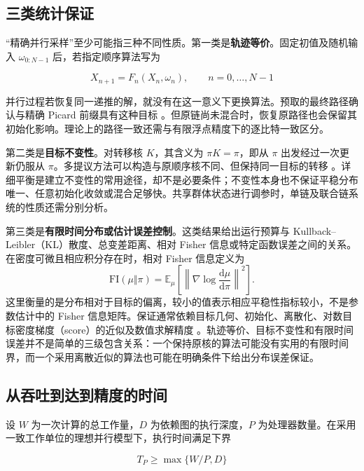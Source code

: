 \documentclass[UTF8,a4paper,zihao=-4,fontset=fandol]{ctexart}
\begin{document}
\subsection{三类统计保证}

“精确并行采样”至少可能指三种不同性质。第一类是\textbf{轨迹等价}。固定初值及随机输入 $\omega_{0:N-1}$ 后，若指定顺序算法写为

\begin{equation}
X_{n+1}=F_n(X_n,\omega_n),
\qquad n=0,\ldots,N-1
\label{eq:2}
\end{equation}

并行过程若恢复同一递推的解，就没有在这一意义下更换算法。预取的最终路径确认与精确 Picard 前缀具有这种目标 \cite{angelino2014,grazzi2026}。但原链尚未混合时，恢复原路径也会保留其初始化影响。理论上的路径一致还需与有限浮点精度下的逐比特一致区分。

第二类是\textbf{目标不变性}。对转移核 $K$，其含义为 $\pi K=\pi$，即从 $\pi$ 出发经过一次更新仍服从 $\pi$。多提议方法可以构造与原顺序核不同、但保持同一目标的转移 \cite{glattholtz2024}。详细平衡是建立不变性的常用途径，却不是必要条件；不变性本身也不保证平稳分布唯一、任意初始化收敛或混合足够快。共享群体状态进行调参时，单链及联合链系统的性质还需分别分析。

第三类是\textbf{有限时间分布或估计误差控制}。这类结果给出运行预算与 Kullback–Leibler（KL）散度、总变差距离、相对 Fisher 信息或特定函数误差之间的关系。在密度可微且相应积分存在时，相对 Fisher 信息定义为
\[
\mathrm{FI}(\mu\Vert\pi)
=\mathbb E_{\mu}\!\left[\left\|\nabla\log\frac{\mathrm d\mu}{\mathrm d\pi}\right\|^2\right].
\]
这里衡量的是分布相对于目标的偏离，较小的值表示相应平稳性指标较小，不是参数估计中的 Fisher 信息矩阵。保证通常依赖目标几何、初始化、离散化、对数目标密度梯度（score）的近似及数值求解精度 \cite{anari2024,zhou2025parallel}。轨迹等价、目标不变性和有限时间误差并不是简单的三级包含关系：一个保持原核的算法可能没有实用的有限时间界，而一个采用离散近似的算法也可能在明确条件下给出分布误差保证。

\subsection{从吞吐到达到精度的时间}

设 $W$ 为一次计算的总工作量，$D$ 为依赖图的执行深度，$P$ 为处理器数量。在采用一致工作单位的理想并行模型下，执行时间满足下界

\begin{equation}
T_P\geq \max\{W/P,D\}
\label{eq:3}
\end{equation}
\end{document}
